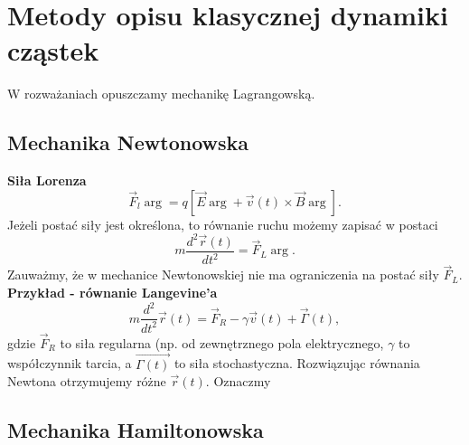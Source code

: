 \section{Metody opisu klasycznej dynamiki cząstek}
W rozważaniach opuszczamy mechanikę Lagrangowską. 
\subsection{Mechanika Newtonowska}
\textbf{Siła Lorenza}
\begin{equation}\label{sila_lorenza}
	\vec{F}_l \arg = q [ \vec{E} \arg+\vec{v}(t)\times\vec{B}\arg].
\end{equation}
Jeżeli postać siły jest określona, to równanie ruchu możemy 
zapisać w postaci
\begin{equation}
	m\frac{d^2\vec{r}(t)}{dt^2}=\vec{F}_L \arg  .
\end{equation}
Zauważmy, że w mechanice Newtonowskiej nie ma ograniczenia na 
postać siły $\vec{F}_L$.
\textbf{Przykład - równanie Langevine'a}
$$ m\frac{d^2}{dt^2} \vec{r}(t) = \vec{F}_R - \gamma\vec{v}(t) +
\vec{\Gamma}(t),$$
gdzie $\vec{F}_R$ to siła regularna (np. od zewnętrznego pola 
elektrycznego, $\gamma$ to współczynnik tarcia, a $\vec{\Gamma(t)}$ 
to siła stochastyczna.
Rozwiązując równania Newtona otrzymujemy różne $\vec{r}(t)$. 
Oznaczmy 
\subsection{Mechanika Hamiltonowska}
